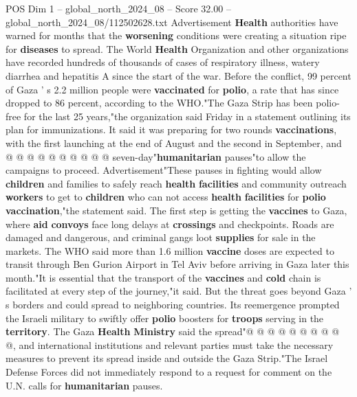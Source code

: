 \begin{textsample}{POS Dim 1 – global\_north\_2024\_08 – Score 32.00 – global\_north\_2024\_08/112502628.txt}
Advertisement \textbf{Health} authorities have warned for months that the \textbf{worsening} conditions were creating a situation ripe for \textbf{diseases} to spread.
The World \textbf{Health} Organization and other organizations have recorded hundreds of thousands of cases of respiratory illness, watery diarrhea and hepatitis A since the start of the war.
Before the conflict, 99 percent of Gaza ' s 2.2 million people were \textbf{vaccinated} for \textbf{polio}, a rate that has since dropped to 86 percent, according to the WHO."The Gaza Strip has been polio-free for the last 25 years,"the organization said Friday in a statement outlining its plan for immunizations.
It said it was preparing for two rounds \textbf{vaccinations}, with the first launching at the end of August and the second in September, and @ @ @ @ @ @ @ @ @ @ seven-day"\textbf{humanitarian} pauses"to allow the campaigns to proceed.
Advertisement"These pauses in fighting would allow \textbf{children} and families to safely reach \textbf{health} \textbf{facilities} and community outreach \textbf{workers} to get to \textbf{children} who can not access \textbf{health} \textbf{facilities} for \textbf{polio} \textbf{vaccination},"the statement said.
The first step is getting the \textbf{vaccines} to Gaza, where \textbf{aid} \textbf{convoys} face long delays at \textbf{crossings} and checkpoints.
Roads are damaged and dangerous, and criminal gangs loot \textbf{supplies} for sale in the markets.
The WHO said more than 1.6 million \textbf{vaccine} doses are expected to transit through Ben Gurion Airport in Tel Aviv before arriving in Gaza later this month."It is essential that the transport of the \textbf{vaccines} and \textbf{cold} chain is facilitated at every step of the journey,"it said.
But the threat goes beyond Gaza ' s borders and could spread to neighboring countries.
Its reemergence prompted the Israeli military to swiftly offer \textbf{polio} boosters for \textbf{troops} serving in the \textbf{territory}.
The Gaza \textbf{Health} \textbf{Ministry} said the spread"@ @ @ @ @ @ @ @ @ @, and international institutions and relevant parties must take the necessary measures to prevent its spread inside and outside the Gaza Strip."The Israel Defense Forces did not immediately respond to a request for comment on the U.N. calls for \textbf{humanitarian} pauses.

\end{textsample}
